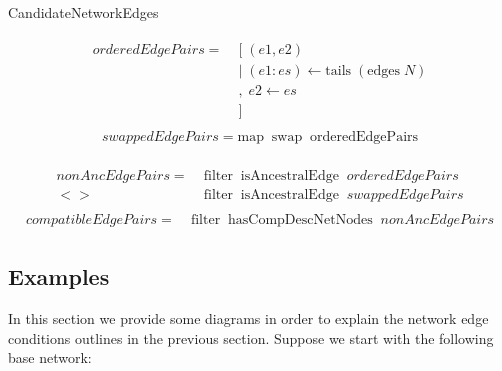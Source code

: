 \documentclass[11pt]{article}
\begin{document}
\newpage 

\begin{algorithm}
		\caption{CandidateNetworkEdges}
		\label{alg:CandidateNetworkEdges}
		\SetAlgoLined
        \begin{align*}
        \begin{split}
         orderedEdgePairs =\; & [\; (e1, e2)\\
                               & |\; (e1 : es) \leftarrow \mathrm{tails}\; (\mathrm{edges}\; N)\\
                               & ,\; e2 \leftarrow es\\
                               & ]
        \end{split}
        \end{align*}
        \begin{align*}
        \begin{split}
        swappedEdgePairs = \mathrm{map\;\;swap\;\;orderedEdgePairs}
        \end{split}
        \end{align*}

        \begin{align*}
        \begin{split}
        nonAncEdgePairs =\;& \mathrm{filter\;\;isAncestralEdge\;\;}orderedEdgePairs\\
                         <>\;\; & \mathrm{filter\;\;isAncestralEdge\;\;}swappedEdgePairs
        \end{split}
        \end{align*}
        \begin{align*}
        \begin{split}
        compatibleEdgePairs =\;& \mathrm{filter\;\;hasCompDescNetNodes\;\;}nonAncEdgePairs
        \end{split}
        \end{align*}


	\end{algorithm}


\subsection{Examples}
In this section we provide some diagrams in order to explain the network edge conditions outlines in the previous section.
Suppose we start with the following base network:
\end{document}
